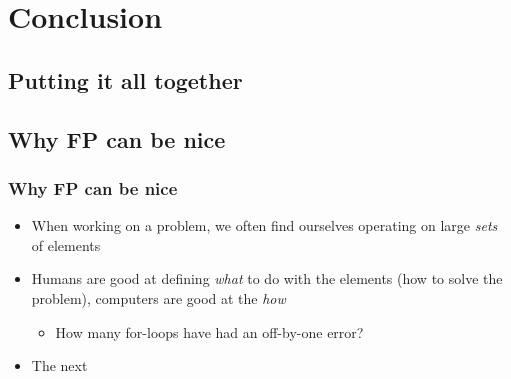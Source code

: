 \documentclass{beamer}
\begin{document}
\section{Conclusion}
  \subsection{Putting it all together}

  \subsection{Why FP can be nice}
  \begin{frame}
    \frametitle{Why FP can be nice}

    \begin{itemize}
      \item When working on a problem, we often find ourselves operating on large
            \textit{sets} of elements
      \item Humans are good at defining \textit{what} to do with the elements
            (how to solve the problem), computers are good at the \textit{how}
        \begin{itemize}
          \item How many for-loops have had an off-by-one error?
        \end{itemize}
      \item The next
    \end{itemize}
  \end{frame}
\end{document}
